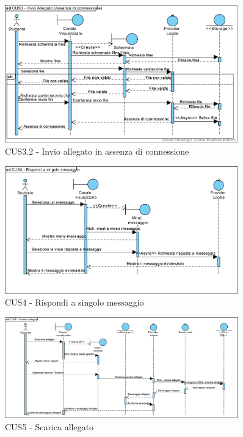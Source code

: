 \begin{figure}
	\centering
	\includegraphics[width=0.9\textwidth]{imgs/gruppo6/sequence/CUS3_invio_allegato_no_connessione.pdf}
	\caption{CUS3.2 - Invio allegato in assenza di connessione}
	\label{fig:seq-cus3mod1}
\end{figure}

\begin{figure}
	\centering
	\includegraphics[width=0.9\textwidth]{imgs/gruppo6/sequence/CUS4_rispondi_a_singolo_messaggio.pdf}
	\caption{CUS4 - Rispondi a singolo messaggio}
	\label{fig:seq-cus4}
\end{figure}

\begin{figure}
	\centering
	\includegraphics[width=0.9\textwidth]{imgs/gruppo6/sequence/CUS5_scarica_allegato.pdf}
	\caption{CUS5 - Scarica allegato}
	\label{fig:seq-cus5}
\end{figure}

